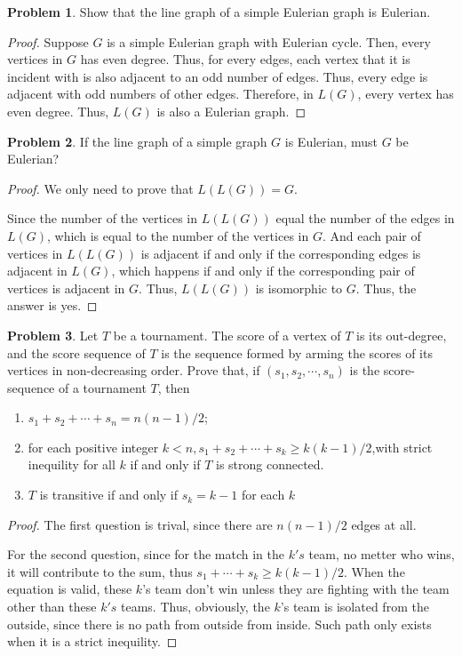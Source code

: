 \documentclass[a4paper,11pt]{article}%
\theoremstyle{remark}
\theoremstyle{definition}
\newtheorem{problem}{Problem}[subsection]
\begin{document}
\begin{problem}
    Show that the line graph of a simple Eulerian graph is Eulerian.
    \begin{proof}
        Suppose $G$ is a simple Eulerian graph with Eulerian cycle.
        Then, every vertices in $G$ has even degree.
        Thus, for every edges, each vertex that it is incident with is 
        also adjacent to an odd number of edges. Thus, every edge is 
        adjacent with odd numbers of other edges. Therefore, in $L(G)$,
        every vertex has even degree. Thus, $L(G)$ is also a Eulerian graph.
    \end{proof}
\end{problem}
\begin{problem}
    If the line graph of a simple graph $G$ is Eulerian, must $G$ 
    be Eulerian?
    \begin{proof}
        We only need to prove that $L(L(G))=G$.

        Since the number of the vertices in $L(L(G))$ equal the number of 
        the edges in $L(G)$, which is equal to the number of the vertices in $G$.
        And each pair of vertices in $L(L(G))$ is adjacent if and only if the corresponding
        edges is adjacent in $L(G)$, which happens if and only if the corresponding pair of vertices is 
        adjacent in $G$. Thus, $L(L(G))$ is isomorphic to $G$. Thus, the answer is yes.
    \end{proof}    
\end{problem}
\begin{problem}
    Let $T$ be a tournament. The score of a vertex of $T$ is its out-degree,
    and the score sequence of $T$ is the sequence formed by arming the scores of its 
    vertices in non-decreasing order. Prove that, if $(s_1,s_2,\cdots,s_n)$ is the 
    score-sequence of a tournament $T$, then 
    \begin{enumerate}
        \item $s_1+s_2+\cdots+s_n=n(n-1)/2$;
        \item for each positive integer $k<n,s_1+s_2+\cdots+s_k\geq k(k-1)/2$,with strict inequility 
        for all $k$ if and only if $T$ is strong connected.
        \item $T$ is transitive if and only if $s_k=k-1$ for each $k$
    \end{enumerate}
    \begin{proof}
        The first question is trival, since there are $n(n-1)/2$ edges at all.

        For the second question, since for the match in the $k's$ team,
        no metter who wins, it will contribute to the sum, thus $s_1+\cdots+s_k\geq k(k-1)/2$.
        When the equation is valid, these $k$'s team don't win unless they are fighting
        with the team other than these $k's$ teams. Thus, obviously, the $k$'s team 
        is isolated from the outside, since there is no path from outside from inside.
        Such path only exists when it is a strict inequility.

    \end{proof}
\end{problem}
\end{document}
